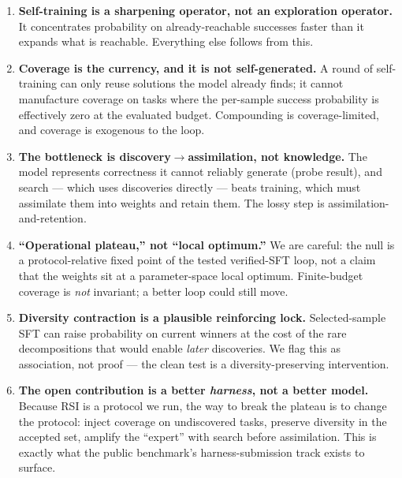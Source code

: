 \begin{enumerate}[leftmargin=1.6em]
\item \textbf{Self-training is a sharpening operator, not an exploration operator.} It concentrates probability
on already-reachable successes faster than it expands what is reachable. Everything else follows from this.

\item \textbf{Coverage is the currency, and it is not self-generated.} A round of self-training can only reuse
solutions the model already finds; it cannot manufacture coverage on tasks where the per-sample success
probability is effectively zero at the evaluated budget. Compounding is coverage-limited, and coverage is
exogenous to the loop.

\item \textbf{The bottleneck is discovery$\to$assimilation, not knowledge.} The model represents correctness it
cannot reliably generate (probe result), and search --- which uses discoveries directly --- beats training,
which must assimilate them into weights and retain them. The lossy step is assimilation-and-retention.

\item \textbf{``Operational plateau,'' not ``local optimum.''} We are careful: the null is a protocol-relative
fixed point of the tested verified-SFT loop, not a claim that the weights sit at a parameter-space local
optimum. Finite-budget coverage is \emph{not} invariant; a better loop could still move.

\item \textbf{Diversity contraction is a plausible reinforcing lock.} Selected-sample SFT can raise probability
on current winners at the cost of the rare decompositions that would enable \emph{later} discoveries. We flag
this as association, not proof --- the clean test is a diversity-preserving intervention.

\item \textbf{The open contribution is a better \emph{harness}, not a better model.} Because RSI is a protocol
we run, the way to break the plateau is to change the protocol: inject coverage on undiscovered tasks, preserve
diversity in the accepted set, amplify the ``expert'' with search before assimilation. This is exactly what the
public benchmark's harness-submission track exists to surface.
\end{enumerate}

